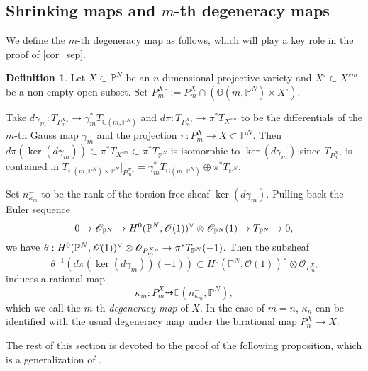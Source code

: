 \documentclass[a4paper,12pt]{amsart}
\theoremstyle{plain}
\theoremstyle{definition}
\newtheorem{defn}[defn]{Definition}
\begin{document}
\subsection{Shrinking maps and $m$-th degeneracy maps}

We define the $m$-th degeneracy map as follows, which will play a key role
in the proof of \autoref{cor_sep}.

\begin{defn}\label{thm:def-kappa} 
  Let $X \subset {\mathbb{P}}^N$ be an $n$-dimensional projective variety
  and 
  ${X{^\circ}} \subset X^{sm}$ be a non-empty open subset. 
  Set ${{P_m^{X}}{^\circ}} := {P_m^{X}} \cap ({{\mathbb{G}}(m,{{\mathbb{P}}^N})} \times {X{^\circ}})$.
  
  
  Take
  $d \gamma_m : T_{{P_m^{X}}{^\circ}} \rightarrow \gamma_m^{*} T_{{\mathbb {G}}(m,{\mathbb{P}}^N)}$
  and
  $d \pi: T_{{P_m^{X}}{^\circ}} \rightarrow \pi^{*} T_{X^{sm}}$
  to be the differentials of the $m$-th Gauss map $\gamma_m$
  and the projection $\pi: P_m^X \rightarrow X \subset {{\mathbb{P}}^N}$.
  Then
  $d\pi (\ker (d \gamma_m)) \subset \pi^*T_{X^{sm}} \subset \pi^*T_{{\mathbb{P}}^N}$
  is isomorphic to $\ker (d \gamma_m)$
  since $ T_{{P_m^{X}}{^\circ}} $ is contained in $T_{{\mathbb {G}}(m,{\mathbb{P}}^N) \times {\mathbb{P}}^N} |_{{P_m^{X}}{^\circ}}= \gamma_m^{*} T_{{\mathbb {G}}(m,{\mathbb{P}}^N)} \oplus \pi^*T_{{\mathbb{P}}^N} $.

  Set $n^-_{\kappa_m} $ to be the rank of the torsion free sheaf
  $\ker (d \gamma_m) $.
  Pulling back the Euler sequence
  \[
  0 \rightarrow {\mathscr{O}}_{{\mathbb{P}}^N} \rightarrow H^0({{\mathbb{P}}^N}, {\mathscr{O}}(1))\spcheck \otimes {\mathscr{O}}_{{\mathbb{P}}^N}(1) \rightarrow T_{{\mathbb{P}}^N} \rightarrow 0,
  \]
  we have $\theta: H^0({{\mathbb{P}}^N}, {\mathscr{O}}(1))\spcheck \otimes {\mathscr{O}}_{{P_m^{X}}{^\circ}} \rightarrow \pi^*T_{{\mathbb{P}}^N}(-1)$.
  Then the subsheaf
  \[
  \theta^{-1} (d\pi (\ker (d \gamma_m))(-1))
  \subset
  H^0({\mathbb{P}}^N,{\mathscr{O}}(1))^{\vee} \otimes {\mathscr{O}}_{{P_m^{X}}{^\circ}}
  \]
  induces a rational map
  \[
  \kappa_m : P_m^{X} \dashrightarrow {\mathbb {G}}(n^-_{\kappa_m} , {\mathbb{P}}^N ),
  \]
  which we call the $m$-th \emph{degeneracy map} of $X$.
  In the case of $m=n$,
  $\kappa_n$ can be identified with the usual degeneracy map
  under the birational map $P_n^{X} \rightarrow X$.
\end{defn}

The rest of this section is devoted to the proof of the following proposition,
which is a generalization of \cite[Proposition 5.2]{FI}.
\end{document}
